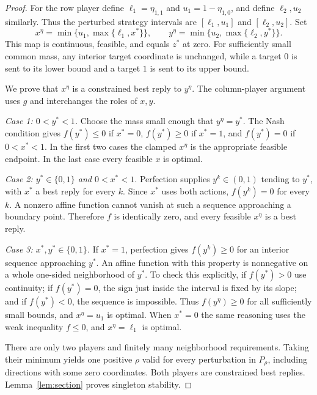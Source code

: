 \documentclass[11pt]{article}
\theoremstyle{definition}
\theoremstyle{remark}
\begin{document}
\begin{proof}
For the row player define $\ell_1=\eta_{1,1}$ and
$u_1=1-\eta_{1,0}$, and define $\ell_2,u_2$ similarly. Thus the perturbed
strategy intervals are $[\ell_1,u_1]$ and $[\ell_2,u_2]$. Set
\begin{equation}\label{eq:clamp}
 x^\eta=\min\{u_1,\max\{\ell_1,x^*\}\},\qquad
 y^\eta=\min\{u_2,\max\{\ell_2,y^*\}\}.
\end{equation}
This map is continuous, feasible, and equals $z^*$ at zero.
For sufficiently small common mass, any interior target coordinate is
unchanged, while a target $0$ is sent to its lower bound and a target $1$
is sent to its upper bound.

We prove that $x^\eta$ is a constrained best reply to $y^\eta$.
The column-player argument uses $g$ and interchanges the roles of $x,y$.

\smallskip
\noindent\emph{Case 1: $0<y^*<1$.}
Choose the mass small enough that $y^\eta=y^*$. The Nash condition gives
$f(y^*)\le0$ if $x^*=0$, $f(y^*)\ge0$ if $x^*=1$, and $f(y^*)=0$ if
$0<x^*<1$. In the first two cases the clamped $x^\eta$ is the appropriate
feasible endpoint. In the last case every feasible $x$ is optimal.

\smallskip
\noindent\emph{Case 2: $y^*\in\{0,1\}$ and $0<x^*<1$.}
Perfection supplies $y^k\in(0,1)$ tending to $y^*$, with $x^*$ a best reply
for every $k$. Since $x^*$ uses both actions, $f(y^k)=0$ for every $k$.
A nonzero affine function cannot vanish at such a sequence approaching a
boundary point. Therefore $f$ is identically zero, and every feasible
$x^\eta$ is a best reply.

\smallskip
\noindent\emph{Case 3: $x^*,y^*\in\{0,1\}$.}
If $x^*=1$, perfection gives $f(y^k)\ge0$ for an interior sequence approaching
$y^*$. An affine function with this property is nonnegative on a whole
one-sided neighborhood of $y^*$. To check this explicitly, if $f(y^*)>0$
use continuity; if $f(y^*)=0$, the sign just inside the interval is fixed by
its slope; and if $f(y^*)<0$, the sequence is impossible. Thus $f(y^\eta)\ge0$
for all sufficiently small bounds, and $x^\eta=u_1$ is optimal. When $x^*=0$
the same reasoning uses the weak inequality $f\le0$, and $x^\eta=\ell_1$
is optimal.

There are only two players and finitely many neighborhood requirements.
Taking their minimum yields one positive $\rho$ valid for every perturbation
in $P_\rho$, including directions with some zero coordinates. Both players
are constrained best replies. Lemma~\ref{lem:section} proves singleton stability.
\end{proof}
\end{document}

